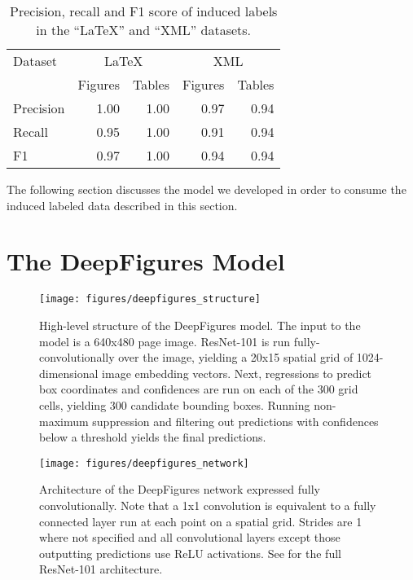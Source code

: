 \documentclass[sigconf]{acmart}
\begin{document}
\begin{table}
\begin{center}
\begin{tabular}{|l|rr|rr|} \hline
Dataset        & \multicolumn{2}{c|}{LaTeX} & \multicolumn{2}{c|}{XML} \\
               & Figures & Tables & Figures & Tables \\ \hline 
Precision      & 1.00    & 1.00   & 0.97    & 0.94   \\ 
Recall         & 0.95    & 1.00   & 0.91    & 0.94   \\ 
F1             & 0.97    & 1.00   & 0.94    & 0.94   \\ \hline
\end{tabular}
\vspace{0.2cm}
\caption{Precision, recall and F1 score of induced labels in the ``LaTeX'' and ``XML'' datasets. }\label{tab:dataset_eval}
\end{center}
\end{table}The following section discusses the model we developed in order to consume the induced labeled data described in this section.


\section{The DeepFigures Model}\label{sec:model}\begin{figure*}
\texttt{[image: figures/deepfigures\_structure]}
\caption{High-level structure of the DeepFigures model. The input to the model is a 640x480 page image. ResNet-101 is run fully-convolutionally over the image, yielding a 20x15 spatial grid of 1024-dimensional image embedding vectors. Next, regressions to predict box coordinates and confidences are run on each of the 300 grid cells, yielding 300 candidate bounding boxes. Running non-maximum suppression and filtering out predictions with confidences below a threshold yields the final predictions.}
\label{fig:structure}
\end{figure*}\begin{figure}
\texttt{[image: figures/deepfigures\_network]}
\caption{Architecture of the DeepFigures network expressed fully convolutionally. Note that a 1x1 convolution is equivalent to a fully connected layer run at each point on a spatial grid. Strides are 1 where not specified and all convolutional layers except those outputting predictions use ReLU activations. See \cite{resnet} for the full ResNet-101 architecture.}
\label{fig:network}
\end{figure}
\end{document}
